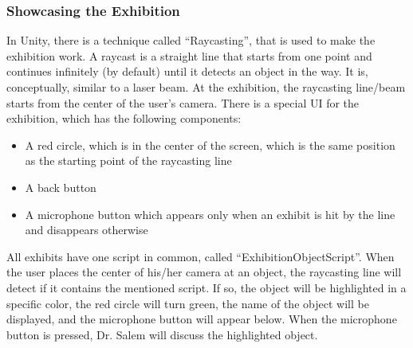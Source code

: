 \subsubsection{Showcasing the Exhibition}
In Unity, there is a technique called “Raycasting”, that is used to make the exhibition work. A raycast is a straight line that starts from one point and continues infinitely (by default) until it detects an object in the way.  It is, conceptually, similar to a laser beam. At the exhibition, the raycasting line/beam starts from the center of the user’s camera. There is a special UI for the exhibition, which has the following components:
\begin{itemize}
    \item{A red circle, which is in the center of the screen, which is the same position as the starting point of the raycasting line}
    
    \item{A back button}
    
    \item{A microphone button which appears only when an exhibit is hit by the line and disappears otherwise}
    
\end{itemize}
All exhibits have one script in common, called “ExhibitionObjectScript”. When the user places the center of his/her camera at an object, the raycasting line will detect if it contains the mentioned script. If so, the object will be highlighted in a specific color, the red circle will turn green, the name of the object will be displayed, and the microphone button will appear below. When the microphone button is pressed, Dr. Salem will discuss the highlighted object.
